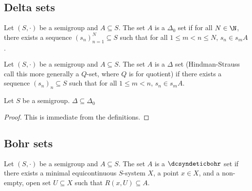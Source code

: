 \subsection{Delta sets}

\begin{definition}
\leanok{}
Let $(S,\cdot)$ be a semigroup and $A \subseteq S$.
The set $A$ is a $\Delta_0$ set if for all $N \in \N$, there exists a sequence $(s_n)_{n=1}^N \subseteq S$ such that for all $1 \leq m < n \leq N$, $s_n \in s_m A$.
\end{definition}

\begin{definition}
\leanok{}
Let $(S,\cdot)$ be a semigroup and $A \subseteq S$. The set $A$ is a $\Delta$ set (Hindman-Strauss call this more generally a $Q$-set, where $Q$ is for quotient) if there exists a sequence $(s_n)_n \subseteq S$ such that for all $1 \leq m < n$, $s_n \in s_m A$.
\end{definition}

\begin{theorem}
    \label{thm_delta_in_deltazero}
    \leanok{}
    Let $S$ be a semigroup.  $\Delta \subseteq \Delta_0$
\end{theorem}

\begin{proof}
\leanok{}
    This is immediate from the definitions.
\end{proof}

\subsection{Bohr sets}



\begin{definition}
\label{def_dcsyndeticbohr}
\leanok{}
Let $(S,\cdot)$ be a semigroup and $A \subseteq S$. The set $A$ is a $\dcsyndeticbohr$ set if there exists a minimal equicontinuous $S$-system $X$, a point $x \in X$, and a non-empty, open set $U \subseteq X$ such that $R(x,U) \subseteq A$.
\end{definition}

